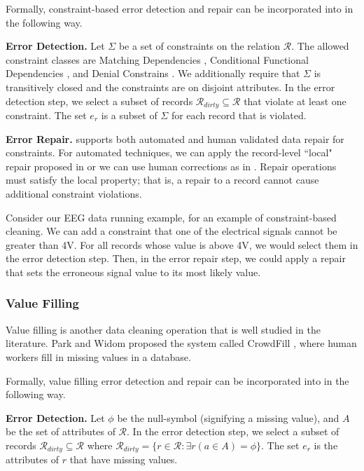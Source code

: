 Formally, constraint-based error detection and repair can be incorporated into \sys in the following way.

\noindent\textbf{Error Detection. } Let $\Sigma$ be a set of constraints on the relation $\mathcal{R}$. 
The allowed constraint classes are Matching Dependencies \cite{bertossi2013data}, Conditional Functional Dependencies \cite{DBLP:journals/pvldb/FanLMTY10}, and Denial Constrains \cite{khayyat2015bigdansing}. 
We additionally require that $\Sigma$ is transitively closed and the constraints are on disjoint attributes.
In the error detection step, we select a subset of records $\mathcal{R}_{dirty} \subseteq \mathcal{R}$ that violate at least one constraint.
The set $e_r$ is a subset of $\Sigma$ for each record that is violated.

\noindent\textbf{Error Repair. } \sys supports both automated and human validated data repair for constraints. For automated techniques, we can apply the record-level ``local" repair proposed in \cite{DBLP:journals/pvldb/FanLMTY10} or we can use human corrections as in \cite{DBLP:journals/pvldb/YakoutENOI11}. Repair operations must satisfy the local property; that is, a repair to a record cannot cause additional constraint violations.

\begin{example}
Consider our EEG data running example, for an example of constraint-based cleaning.
We can add a constraint that one of the electrical signals cannot be greater than 4V.
For all records whose value is above 4V, we would select them in the error detection step.
Then, in the error repair step, we could apply a repair that sets the erroneous signal value to its most likely value.
\end{example}

\subsubsection{Value Filling}
Value filling is another data cleaning operation that is well studied in the literature.
Park and Widom proposed the system called CrowdFill \cite{park2014crowdfill}, where human workers fill in missing values in a database.

Formally, value filling error detection and repair can be incorporated into \sys in the following way.

\noindent\textbf{Error Detection. } Let $\phi$ be the null-symbol (signifying a missing value), and $A$ be the set of attributes of $\mathcal{R}$. In the error detection step, we select a subset of records $\mathcal{R}_{dirty} \subseteq \mathcal{R}$ where $\mathcal{R}_{dirty}=\{r \in \mathcal{R}: \exists r(a\in A) = \phi \}$.
The set $e_r$ is the attributes of $r$ that have missing values.


